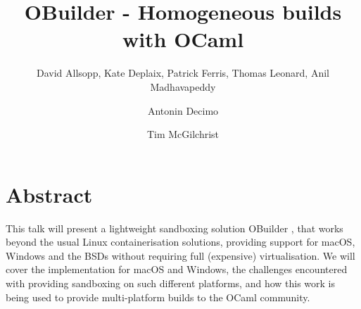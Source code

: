 \documentclass[manuscript,screen,sigplan]{acmart}
\begin{document}
\title{OBuilder - Homogeneous builds with OCaml}

\author{David Allsopp, Kate Deplaix, Patrick Ferris, Thomas Leonard, Anil Madhavapeddy}

\author{Antonin Decimo}

\author{Tim McGilchrist}

\renewcommand{\shortauthors}{McGilchrist}
\newcommand{\N}{\mathbb{T}}


\maketitle

\section{Abstract}

This talk will present a lightweight sandboxing solution OBuilder \cite{Obuilder22}, that works beyond the usual Linux containerisation solutions, providing support for macOS, Windows and the BSDs without requiring full (expensive) virtualisation. We will cover the implementation for macOS and Windows, the challenges encountered with providing sandboxing on such different platforms, and how this work is being used to provide multi-platform builds to the OCaml community.
\end{document}
